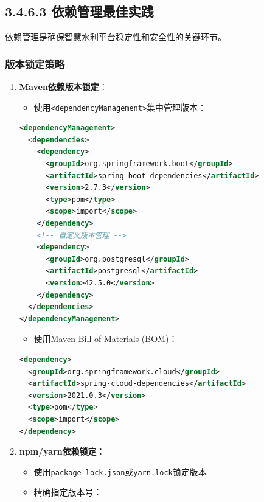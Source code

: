 \subsection{3.4.6.3
依赖管理最佳实践}\label{ux4f9dux8d56ux7ba1ux7406ux6700ux4f73ux5b9eux8df5}

依赖管理是确保智慧水利平台稳定性和安全性的关键环节。

\subsubsection{版本锁定策略}\label{ux7248ux672cux9501ux5b9aux7b56ux7565}

\begin{enumerate}
\def\labelenumi{\arabic{enumi}.}
\tightlist
\item
  \textbf{Maven依赖版本锁定}：

  \begin{itemize}
  \tightlist
  \item
    使用\passthrough{\lstinline!<dependencyManagement>!}集中管理版本：
  \end{itemize}

\begin{lstlisting}[language=XML]
<dependencyManagement>
  <dependencies>
    <dependency>
      <groupId>org.springframework.boot</groupId>
      <artifactId>spring-boot-dependencies</artifactId>
      <version>2.7.3</version>
      <type>pom</type>
      <scope>import</scope>
    </dependency>
    <!-- 自定义版本管理 -->
    <dependency>
      <groupId>org.postgresql</groupId>
      <artifactId>postgresql</artifactId>
      <version>42.5.0</version>
    </dependency>
  </dependencies>
</dependencyManagement>
\end{lstlisting}

  \begin{itemize}
  \tightlist
  \item
    使用Maven Bill of Materials (BOM)：
  \end{itemize}

\begin{lstlisting}[language=XML]
<dependency>
  <groupId>org.springframework.cloud</groupId>
  <artifactId>spring-cloud-dependencies</artifactId>
  <version>2021.0.3</version>
  <type>pom</type>
  <scope>import</scope>
</dependency>
\end{lstlisting}
\item
  \textbf{npm/yarn依赖锁定}：

  \begin{itemize}
  \tightlist
  \item
    使用\passthrough{\lstinline!package-lock.json!}或\passthrough{\lstinline!yarn.lock!}锁定版本
  \item
    精确指定版本号：
  \end{itemize}


\end{enumerate}
